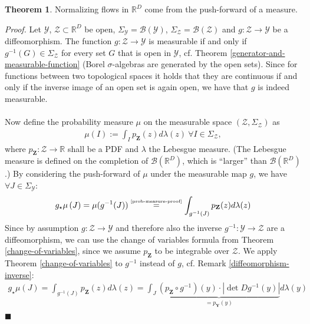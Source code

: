 \documentclass[12pt, a4paper]{article}
\numberwithin{equation}{section}
\theoremstyle{definition}
\theoremstyle{definition}
\newtheorem{theorem}[thm]{Theorem}
\begin{document}
	\begin{theorem}
		Normalizing flows in $\mathbb{R}^D$ come from the push-forward of a measure. 
	\end{theorem}
	\noindent \textit{Proof.} Let $\mathcal Y$, $\mathcal Z\subset\mathbb{R}^D$ be open,  $\Sigma_{\mathcal Y} = \mathcal B(\mathcal Y)$, $\Sigma_{\mathcal Z} = \mathcal B(\mathcal Z)$ and $g: \mathcal Z\rightarrow\mathcal Y$ be a diffeomorphism. The function $g: \mathcal Z \rightarrow \mathcal Y$ is measurable if and only if $g^{-1}(G)\in \Sigma_{\mathcal Z}$ for every set $G$ that is open in $\mathcal Y$, cf. Theorem \ref{generator-and-measurable-function} (Borel $\sigma$-algebras are generated by the open sets). Since for functions between two topological spaces it holds that they are continuous if and only if the inverse image of an open set is again open, we have that $g$ is indeed measurable. 
	\\ \\ Now define the probability measure $\mu$ on the measurable space $(\mathcal Z, \Sigma_{\mathcal Z})$ as 
	\begin{align}\label{prob-measure-proof}
		\mu(I) := \int_{I} p_{\mathbf{Z}}(z)d\lambda(z) \ \forall I\in \Sigma_{\mathcal Z}, 
	\end{align}
	where $p_{\mathbf{Z}}: \mathcal Z \rightarrow\mathbb{R}$ shall be a PDF and $\lambda$ the Lebesgue measure. (The Lebesgue measure is defined on the completion of $\mathcal B(\mathbb R^D)$, which is \enquote{larger} than $\mathcal B(\mathbb R^D)$.) By considering the push-forward of $\mu$ under the measurable map $g$, we have $\forall J \in \Sigma_{\mathcal Y}$: 
	\begin{align}
		g_{\star}\mu\left(J\right) = \mu(g^{-1}(J))  \overset{\tiny\eqref{prob-measure-proof}}{=} \int_{g^{-1}(J)} p_{\mathbf{Z}}(z)d\lambda(z)
	\end{align}
	Since by assumption $g:\mathcal Z\rightarrow \mathcal Y$ and therefore also the inverse $g^{-1}: \mathcal Y \rightarrow \mathcal Z$ are a diffeomorphism, we can use the change of variables formula from Theorem \ref{change-of-variables}, since we assume $p_{\mathbf{Z}}$ to be integrable over $\mathcal Z$. We apply Theorem \ref{change-of-variables} to $g^{-1}$ instead of $g$, cf. Remark \ref{diffeomorphism-inverse}: 
	\begin{align}
		g_{\star}\mu(J) = \int_{g^{-1}(J)}p_{\mathbf{Z}}(z)d\lambda(z) = \int_{J} \underbrace{\left(p_{\mathbf{Z}}\circ g^{-1}\right)(y) \cdot \left\vert \det Dg^{-1}(y) \right\vert }_{= p_{\mathbf{Y}}(y)} d\lambda(y) 						
	\end{align}
	\qquad\qquad\qquad\qquad\qquad\qquad\qquad\qquad\qquad\qquad\qquad\qquad\qquad\qquad\qquad\qquad\qquad\qquad\qquad\qquad\qquad\quad$\blacksquare$
	
\end{document}
